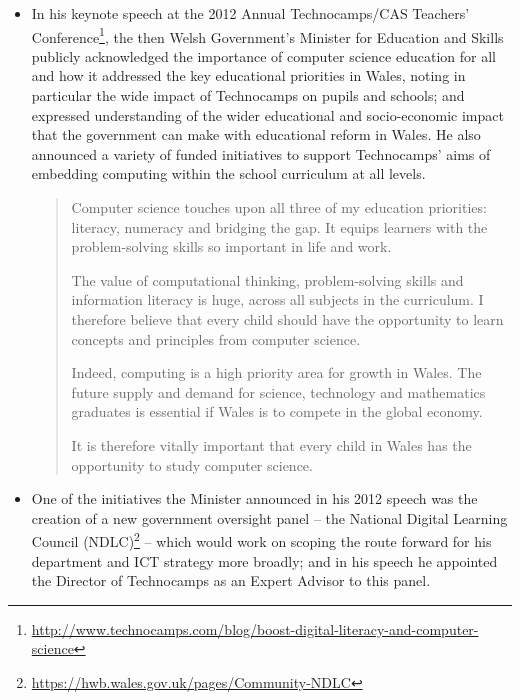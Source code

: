 \begin{itemize}

\item
In his keynote speech at the 2012 Annual Technocamps/CAS Teachers'
Conference\footnote{\url{http://www.technocamps.com/blog/boost-digital-literacy-and-computer-science}},
the then Welsh Government's Minister for Education and Skills publicly
acknowledged the importance of computer science education for all and
how it addressed the key educational priorities in Wales, noting in particular
the wide impact of Technocamps on pupils and schools; and expressed 
understanding of the wider educational and socio-economic impact that
the government can make with educational reform in Wales. He also
announced a variety of funded initiatives to support Technocamps' aims
of embedding computing within the school curriculum at all levels.

\begin{quotation}
Computer science touches upon all three of my education priorities:
literacy, numeracy and bridging the gap. It equips learners with the
problem-solving skills so important in life and work.

The value of computational thinking, problem-solving skills and
information literacy is huge, across all subjects in the curriculum. I
therefore believe that every child should have the opportunity to
learn concepts and principles from computer science.

Indeed, computing is a high priority area for growth in Wales. The
future supply and demand for science, technology and mathematics
graduates is essential if Wales is to compete in the global economy.

It is therefore vitally important that every child in Wales has the
opportunity to study computer science.
\end{quotation}

\item
One of the initiatives the Minister announced in his 2012 speech was
the creation of a new government oversight panel -- the National
Digital Learning Council
(NDLC)\footnote{\url{https://hwb.wales.gov.uk/pages/Community-NDLC}}
-- which would work on scoping the route forward for his department
and ICT strategy more broadly;
and in his speech he appointed
the Director of Technocamps as an Expert Advisor
to this panel.


\end{itemize}
